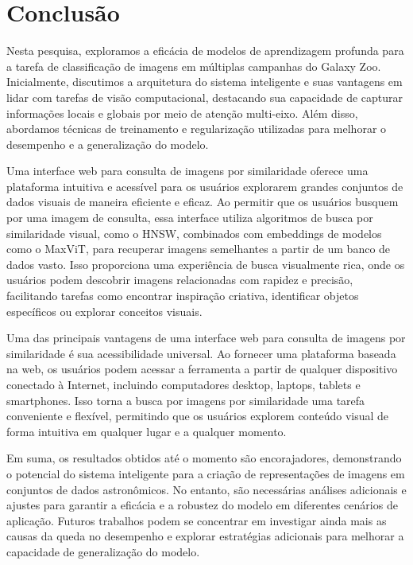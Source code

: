 \documentclass[a4,12pt]{horizon-theme}
\begin{document}
\section{Conclusão}
Nesta pesquisa, exploramos a eficácia de modelos de aprendizagem profunda para a tarefa de classificação de imagens em múltiplas campanhas do Galaxy Zoo. Inicialmente, discutimos a arquitetura do sistema inteligente e suas vantagens em lidar com tarefas de visão computacional, destacando sua capacidade de capturar informações locais e globais por meio de atenção multi-eixo. Além disso, abordamos técnicas de treinamento e regularização utilizadas para melhorar o desempenho e a generalização do modelo.


Uma interface web para consulta de imagens por similaridade oferece uma plataforma intuitiva e acessível para os usuários explorarem grandes conjuntos de dados visuais de maneira eficiente e eficaz. Ao permitir que os usuários busquem por uma imagem de consulta, essa interface utiliza algoritmos de busca por similaridade visual, como o HNSW, combinados com embeddings de modelos como o MaxViT, para recuperar imagens semelhantes a partir de um banco de dados vasto. Isso proporciona uma experiência de busca visualmente rica, onde os usuários podem descobrir imagens relacionadas com rapidez e precisão, facilitando tarefas como encontrar inspiração criativa, identificar objetos específicos ou explorar conceitos visuais.

Uma das principais vantagens de uma interface web para consulta de imagens por similaridade é sua acessibilidade universal. Ao fornecer uma plataforma baseada na web, os usuários podem acessar a ferramenta a partir de qualquer dispositivo conectado à Internet, incluindo computadores desktop, laptops, tablets e smartphones. Isso torna a busca por imagens por similaridade uma tarefa conveniente e flexível, permitindo que os usuários explorem conteúdo visual de forma intuitiva em qualquer lugar e a qualquer momento.

Em suma, os resultados obtidos até o momento são encorajadores, demonstrando o potencial do sistema inteligente para a criação de representações de imagens em conjuntos de dados astronômicos. No entanto, são necessárias análises adicionais e ajustes para garantir a eficácia e a robustez do modelo em diferentes cenários de aplicação. Futuros trabalhos podem se concentrar em investigar ainda mais as causas da queda no desempenho e explorar estratégias adicionais para melhorar a capacidade de generalização do modelo.
\end{document}
